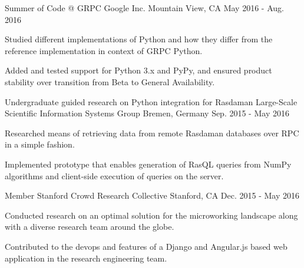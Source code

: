 

\begin{cventries}
  \cventry
    {Summer of Code @ GRPC} %
    {Google Inc.} %
    {Mountain View, CA} %
    {May 2016 - Aug. 2016} %
    {
      \begin{cvitems} %
        \item {Studied different implementations of Python and how they differ from the reference implementation in context of GRPC Python.}
        \item {Added and tested support for Python 3.x and PyPy, and ensured product stability over transition from Beta to General Availability.}
      \end{cvitems}
    }
  \cventry
    {Undergraduate guided research on Python integration for Rasdaman} %
    {Large-Scale Scientific Information Systems Group} %
    {Bremen, Germany} %
    {Sep. 2015 - May 2016} %
    {
      \begin{cvitems} %
        \item {Researched means of retrieving data from remote Rasdaman databases over RPC in a simple fashion.}
        \item {Implemented prototype that enables generation of RasQL queries from NumPy algorithms and client-side execution of queries on the server.}
      \end{cvitems} 
    }
\cventry
  {Member} %
  {Stanford Crowd Research Collective} %
  {Stanford, CA} %
  {Dec. 2015 - May 2016} %
  {
    \begin{cvitems} %
      \item {Conducted research on an optimal solution for the microworking landscape along with a diverse research team around the globe.}
      \item {Contributed to the devops and features of a Django and Angular.js based web application in the research engineering team.}

\end{cvitems}}
\end{cventries}
